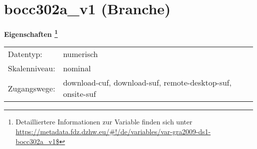 
    \setcounter{footnote}{0}

    \vspace*{-1.8cm}
	\section{bocc302a\_v1 (Branche)}
	\label{section:bocc302a_v1}



    \vspace*{0.5cm}
    \noindent\textbf{Eigenschaften
	\footnote{Detailliertere Informationen zur Variable finden sich unter
		\url{https://metadata.fdz.dzhw.eu/\#!/de/variables/var-gra2009-ds1-bocc302a_v1$}}}\\
	\begin{tabularx}{\hsize}{@{}lX}
	Datentyp: & numerisch \\
	Skalenniveau: & nominal \\
	Zugangswege: &
	  download-cuf, 
	  download-suf, 
	  remote-desktop-suf, 
	  onsite-suf
 \\
    \end{tabularx}



